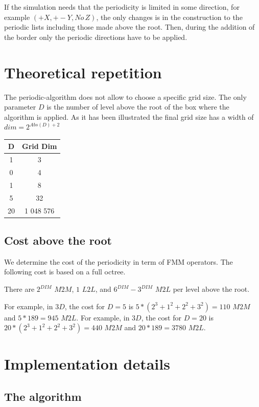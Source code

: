 \documentclass[12pt]{article} %
\begin{document}
If the simulation needs that the periodicity is limited in some direction, for example $(+X,+-Y,No \, Z)$, the only changes is in the construction to the periodic lists including those made above the root.
Then, during the addition of the border only the periodic directions have to be applied.

\section{Theoretical repetition}

The periodic-algorithm does not allow to choose a specific grid size.
The only parameter $D$ is the number of level above the root of the box where the algorithm is applied.
As it has been illustrated the final grid size has a width of $dim = 2^{Abs(D)+2}$

\begin{center}
\begin{tabular}{ | c | c | }
 \hline                 
   D & Grid Dim \\ \hline
   1 & 3 \\
   0 & 4 \\
   1 & 8 \\
   5 & 32 \\
   20 & 1 048 576 \\
 \hline  
 \end{tabular}
\end{center}

\subsection{Cost above the root}
We determine the cost of the periodicity in term of FMM operators.
The following cost is based on a full octree.

There are $2^{DIM}$ $M2M$, $1$ $L2L$, and $6^{DIM}-3^{DIM}$ $M2L$ per level above the root.

For example, in $3D$, the cost for $D=5$ is $5*(2^3 + 1^2 + 2^2 + 3^2) = 110$ $M2M$ and $5*189 = 945$ $M2L$.
For example, in $3D$, the cost for $D=20$ is $20*(2^3 + 1^2 + 2^2 + 3^2) = 440$ $M2M$ and $20*189 = 3780$ $M2L$.


\section{Implementation details}

\subsection{The algorithm}
\end{document}
